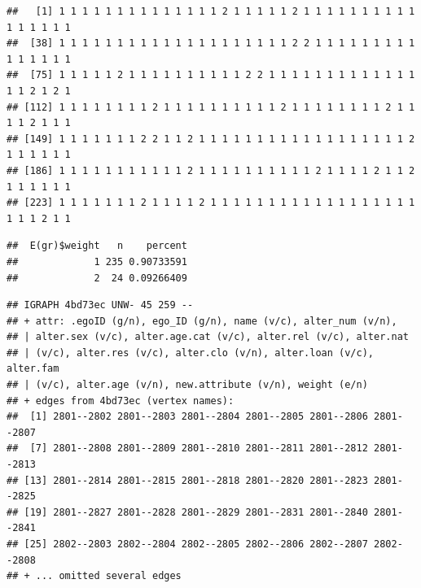 \documentclass[
]{book}
\newenvironment{Shaded}{\begin{snugshade}}{\end{snugshade}}
\newcommand{\CommentTok}[1]{\textcolor[rgb]{0.56,0.35,0.01}{\textit{#1}}}
\newcommand{\DecValTok}[1]{\textcolor[rgb]{0.00,0.00,0.81}{#1}}
\newcommand{\FunctionTok}[1]{\textcolor[rgb]{0.00,0.00,0.00}{#1}}
\newcommand{\NormalTok}[1]{#1}
\newcommand{\OtherTok}[1]{\textcolor[rgb]{0.56,0.35,0.01}{#1}}
\newcommand{\SpecialCharTok}[1]{\textcolor[rgb]{0.00,0.00,0.00}{#1}}
\begin{document}
\begin{Shaded}
\end{Shaded}

\begin{verbatim}
##   [1] 1 1 1 1 1 1 1 1 1 1 1 1 1 1 2 1 1 1 1 1 2 1 1 1 1 1 1 1 1 1 1 1 1 1 1 1 1
##  [38] 1 1 1 1 1 1 1 1 1 1 1 1 1 1 1 1 1 1 1 1 2 2 1 1 1 1 1 1 1 1 1 1 1 1 1 1 1
##  [75] 1 1 1 1 1 2 1 1 1 1 1 1 1 1 1 1 2 2 1 1 1 1 1 1 1 1 1 1 1 1 1 1 1 2 1 2 1
## [112] 1 1 1 1 1 1 1 1 2 1 1 1 1 1 1 1 1 1 1 2 1 1 1 1 1 1 1 1 2 1 1 1 1 2 1 1 1
## [149] 1 1 1 1 1 1 1 2 2 1 1 2 1 1 1 1 1 1 1 1 1 1 1 1 1 1 1 1 1 1 2 1 1 1 1 1 1
## [186] 1 1 1 1 1 1 1 1 1 1 1 2 1 1 1 1 1 1 1 1 1 1 2 1 1 1 1 2 1 1 2 1 1 1 1 1 1
## [223] 1 1 1 1 1 1 1 2 1 1 1 1 2 1 1 1 1 1 1 1 1 1 1 1 1 1 1 1 1 1 1 1 1 1 2 1 1
\end{verbatim}

\begin{Shaded}
\end{Shaded}

\begin{verbatim}
##  E(gr)$weight   n    percent
##             1 235 0.90733591
##             2  24 0.09266409
\end{verbatim}

\begin{Shaded}
\end{Shaded}

\begin{verbatim}
## IGRAPH 4bd73ec UNW- 45 259 -- 
## + attr: .egoID (g/n), ego_ID (g/n), name (v/c), alter_num (v/n),
## | alter.sex (v/c), alter.age.cat (v/c), alter.rel (v/c), alter.nat
## | (v/c), alter.res (v/c), alter.clo (v/n), alter.loan (v/c), alter.fam
## | (v/c), alter.age (v/n), new.attribute (v/n), weight (e/n)
## + edges from 4bd73ec (vertex names):
##  [1] 2801--2802 2801--2803 2801--2804 2801--2805 2801--2806 2801--2807
##  [7] 2801--2808 2801--2809 2801--2810 2801--2811 2801--2812 2801--2813
## [13] 2801--2814 2801--2815 2801--2818 2801--2820 2801--2823 2801--2825
## [19] 2801--2827 2801--2828 2801--2829 2801--2831 2801--2840 2801--2841
## [25] 2802--2803 2802--2804 2802--2805 2802--2806 2802--2807 2802--2808
## + ... omitted several edges
\end{verbatim}
\end{document}
